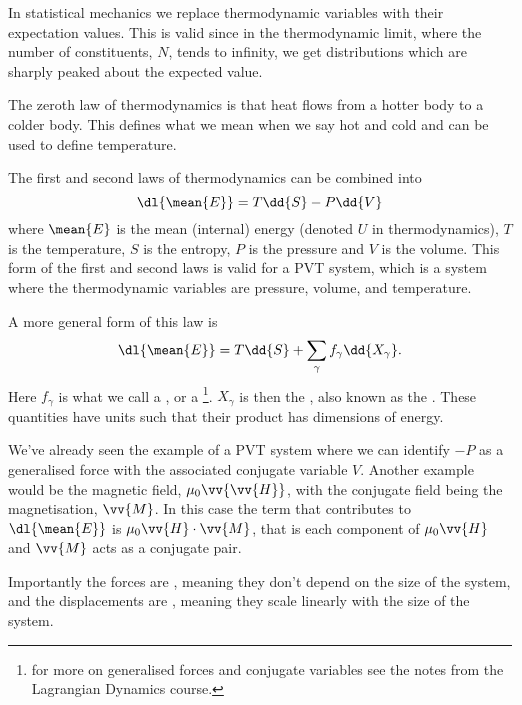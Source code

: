 \documentclass[fleqn]{NotesClass}
\begin{document}
    In statistical mechanics we replace thermodynamic variables with their expectation values.
    This is valid since in the thermodynamic limit, where the number of constituents, \(N\), tends to infinity, we get distributions which are sharply peaked about the expected value.
    
    The zeroth law of thermodynamics is that heat flows from a hotter body to a colder body.
    This defines what we mean when we say hot and cold and can be used to define temperature.
    
    The first and second laws of thermodynamics can be combined into
    \begin{equation}
        \dl{\mean{E}} = T\dd{S} - P\dd{V}
    \end{equation}
    where \(\mean{E}\) is the mean (internal) energy (denoted \(U\) in thermodynamics), \(T\) is the temperature, \(S\) is the entropy, \(P\) is the pressure and \(V\) is the volume.
    This form of the first and second laws is valid for a PVT system, which is a system where the thermodynamic variables are pressure, volume, and temperature.
    
    A more general form of this law is
    \begin{equation}
        \dl{\mean{E}} = T \dd{S} + \sum_{\gamma} f_\gamma \dd{X_\gamma}.
    \end{equation}
    Here \(f_\gamma\) is what we call a , or a \footnote{for more on generalised forces and conjugate variables see the notes from the Lagrangian Dynamics course.}.
    \(X_\gamma\) is then the , also known as the .
    These quantities have units such that their product has dimensions of energy.
    
    We've already seen the example of a PVT system where we can identify \(-P\) as a generalised force with the associated conjugate variable \(V\).
    Another example would be the magnetic field, \(\mu_0\vv{\vv{H}}\), with the conjugate field being the magnetisation, \(\vv{M}\).
    In this case the term that contributes to \(\dl{\mean{E}}\) is \(\mu_0 \vv{H} \cdot \vv{M}\), that is each component of \(\mu_0\vv{H}\) and \(\vv{M}\) acts as a conjugate pair.
    
    Importantly the forces are , meaning they don't depend on the size of the system, and the displacements are , meaning they scale linearly with the size of the system.
    
\end{document}
